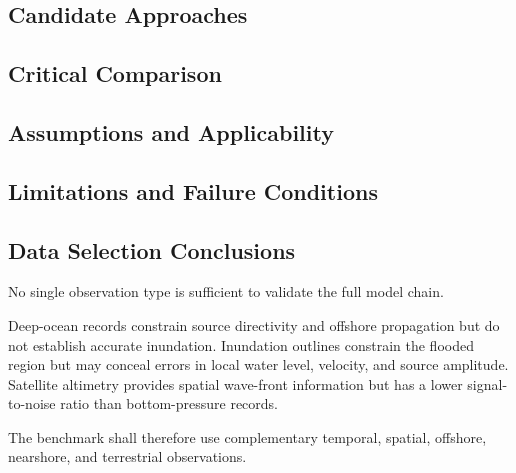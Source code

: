 \subsection{Candidate Approaches}
\label{sec:res-dat-obs-candidate-approaches}


\subsection{Critical Comparison}
\label{sec:res-dat-obs-critical-comparison}


\subsection{Assumptions and Applicability}
\label{sec:res-dat-obs-assumptions}


\subsection{Limitations and Failure Conditions}
\label{sec:res-dat-obs-limitations}


\subsection{Data Selection Conclusions}
\label{sec:res-dat-obs-dataconclusion}

No single observation type is sufficient to validate the full model
chain.

Deep-ocean records constrain source directivity and offshore
propagation but do not establish accurate inundation. Inundation
outlines constrain the flooded region but may conceal errors in local
water level, velocity, and source amplitude. Satellite altimetry
provides spatial wave-front information but has a lower signal-to-noise
ratio than bottom-pressure records.

The benchmark shall therefore use complementary temporal, spatial,
offshore, nearshore, and terrestrial observations.

